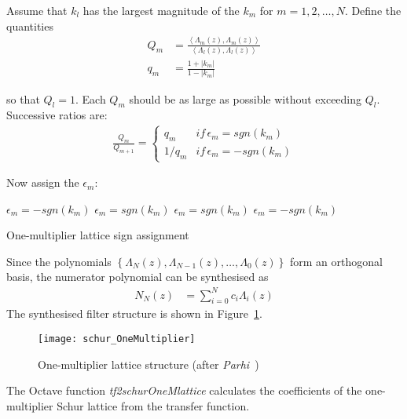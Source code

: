 \documentclass[a4paper,twoside,10pt,english]{report}
\begin{document}
\begin{algorithm}[!htbp]
Assume that $k_{l}$ has the largest magnitude of the $k_{m}$ for
$m=1,2,\ldots,N$. Define the quantities
\begin{align*}
Q_{m} &= \frac{\left\langle \Lambda_{m}\left(z\right),\Lambda_{m}\left(z\right)\right\rangle }{\left\langle \Lambda_{l}\left(z\right),\Lambda_{l}\left(z\right)\right\rangle }\\
q_{m} &= \frac{1+\left|k_{m}\right|}{1-\left|k_{m}\right|}
\end{align*}

so that $Q_{l}=1$. Each $Q_{m}$ should be as large as possible without
exceeding $Q_{l}$. Successive ratios are:
\begin{align}
\frac{Q_{m}}{Q_{m+1}} = \begin{cases}
q_{m} & if\,\epsilon_{m}=sgn\left(k_{m}\right)\\
1/q_{m} & if\,\epsilon_{m}=-sgn\left(k_{m}\right)
\end{cases}\label{eq:OneMultRecursiveKCalc}
\end{align}

Now assign the $\epsilon_{m}$:
\begin{algorithmic}
    \State $\epsilon_{m}=-sgn\left(k_{m}\right)$
  \Else
    \State $\epsilon_{m}=sgn\left(k_{m}\right)$
  \EndIf
\EndFor
{}
    \State $\epsilon_{m}=sgn\left(k_{m}\right)$
  \Else
    \State $\epsilon_{m}=-sgn\left(k_{m}\right)$
  \EndIf
\EndFor
\end{algorithmic}
\caption{One-multiplier lattice sign assignment}
\label{alg:One-multiplier-sign-assignment}
\end{algorithm}

Since the polynomials $\left\{ \Lambda_{N}\left(z\right),\Lambda_{N-1}\left(z\right),\ldots,\Lambda_{0}\left(z\right)\right\} $
form an orthogonal basis, the numerator polynomial can be synthesised as 
\begin{align*}
N_{N}\left(z\right) & = \sum_{i=0}^{N}c_{i}\Lambda_{i}\left(z\right)
\end{align*}
The synthesised filter structure is shown in 
Figure~\ref{fig:One-multiplier-lattice-structure}.
\begin{figure}[!htbp]
\begin{center}
\texttt{[image: schur\_OneMultiplier]}
\caption{One-multiplier lattice structure (after 
\emph{Parhi}~\cite[Fig. 12.11]{Parhi_VLSIDigitalSignalProcessingSystems})}
\label{fig:One-multiplier-lattice-structure}
\end{center}
\end{figure}
The Octave function \emph{tf2schurOneMlattice} calculates the coefficients of 
the one-multiplier Schur lattice from the transfer function.
\end{document}
